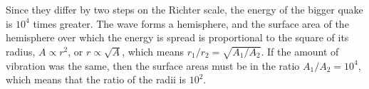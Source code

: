 Since they differ by two steps on the Richter scale, the
energy of the bigger quake is $10^4$ times greater. The wave
forms a hemisphere, and the surface area of the hemisphere
over which the energy is spread is proportional to the
square of its radius, $A \propto r^2$, or $r\propto\sqrt{A}$,
which means $r_1/r_2=\sqrt{A_1/A_2}$. If the amount of vibration was the
same, then the surface areas must be in the ratio
$A_1/A_2=10^4$, which means that the ratio of the radii is $10^2$.
